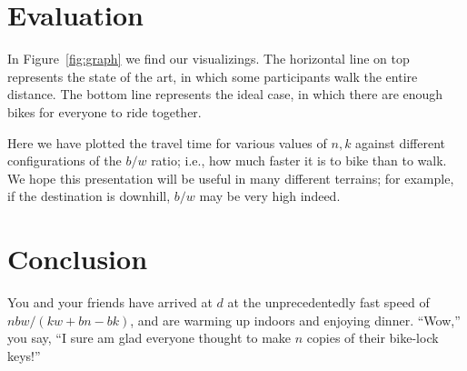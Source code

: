 \documentclass[DIV=calc, paper=a4, fontsize=11pt, twocolumn]{scrartcl}	 %
\newcommand{\initial}[1]{ %
\lettrine[lines=3,lhang=0.3,nindent=0em]{
\color{DarkGoldenrod}
{\textsf{#1}}}{}}
\begin{document}


\section{Evaluation}

\initial{I}n Figure~\ref{fig:graph} we find our visualizings.
The horizontal line on top represents the state of the art, in which some participants walk the entire distance.
The bottom line represents the ideal case, in which there are enough bikes for everyone to ride together.

Here we have plotted the travel time for various values of $n,k$ against different configurations of the $b/w$ ratio; i.e., how much faster it is to bike than to walk.
We hope this presentation will be useful in many different terrains; for example, if the destination is downhill, $b/w$ may be very high indeed.

\section{Conclusion}

\initial{Y}ou and your friends have arrived at $d$ at the unprecedentedly fast speed of $nbw/(kw+bn-bk)$, and are warming up indoors and enjoying dinner. ``Wow,'' you say, ``I sure am glad everyone thought to make $n$ copies of their bike-lock keys!''
\end{document}
